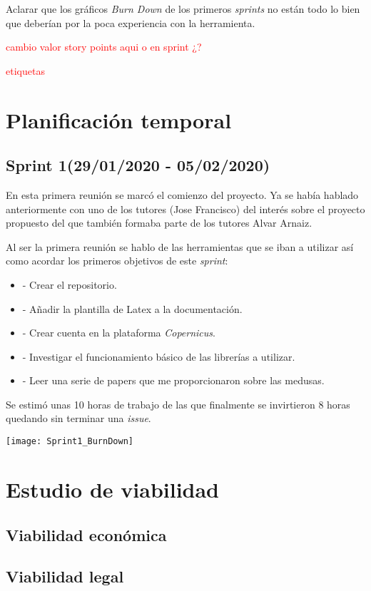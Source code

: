 Aclarar que los gráficos \emph{Burn Down} de los primeros \emph{sprints} no están todo lo bien que deberían por la poca experiencia con la herramienta.

\textcolor{red}{cambio valor story points aqui o en sprint ¿?}
 
\textcolor{red}{etiquetas}

\section{Planificación temporal}

\subsection{Sprint 1(29/01/2020 - 05/02/2020)}\label{Sprint-1}
En esta primera reunión se marcó el comienzo del proyecto. Ya se había hablado anteriormente con uno de los tutores (Jose Francisco) del interés sobre el proyecto propuesto del que también formaba parte de los tutores Alvar Arnaiz.

Al ser la primera reunión se hablo de las herramientas que se iban a utilizar así como acordar los primeros objetivos de este \emph{sprint}:

\begin{itemize}
\item - Crear el repositorio.
\item - Añadir la plantilla de Latex a la documentación.
\item - Crear cuenta en la plataforma \emph{Copernicus}.
\item - Investigar el funcionamiento básico de las librerías a utilizar.
\item - Leer una serie de papers que me proporcionaron sobre las medusas.
\end{itemize}

Se estimó unas 10 horas de trabajo de las que finalmente se invirtieron 8 horas quedando sin terminar una \emph{issue}.

\begin{center}
\texttt{[image: Sprint1\_BurnDown]}
\end{center}

\section{Estudio de viabilidad}

\subsection{Viabilidad económica}

\subsection{Viabilidad legal}


